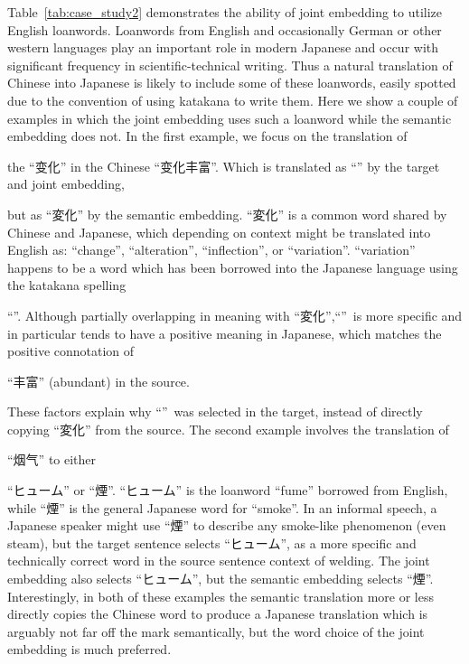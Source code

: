 \begin{CJK}{UTF8}{ipxm}
    Table~\ref{tab:case_study2} demonstrates the ability of joint embedding to utilize English loanwords. Loanwords from English and occasionally German or other western languages play an important role in modern Japanese and occur with significant frequency in scientific-technical writing. Thus a natural translation of Chinese into Japanese is likely to include some of these loanwords, easily spotted due to the convention of using katakana to write them. Here we show a couple of examples in which the joint embedding uses such a loanword while the semantic embedding does not. In the first example, we focus on the translation of \end{CJK}\begin{CJK}{UTF8}{gbsn}the ``变化'' in the Chinese \mbox{``变化丰富''}. Which is translated as ``\variation'' by the target and joint embedding,
    \end{CJK}\begin{CJK}{UTF8}{ipxm} but as ``変化'' by the semantic embedding. ``変化'' is a common word shared by Chinese and Japanese, which depending on context might be translated into English as: ``change'', ``alteration'', ``inflection'', or ``variation''. ``variation'' happens to be a word which has been borrowed into the Japanese language using the katakana spelling \end{CJK}\begin{CJK}{UTF8}{ipxm}``\variation''. Although partially overlapping in meaning with ``変化'',\enspace``\variation''\ is more specific and in particular tends to have a positive meaning in Japanese, which matches the positive connotation of \end{CJK}\begin{CJK}{UTF8}{gbsn}``丰富'' (abundant) in the source. \end{CJK}\begin{CJK}{UTF8}{ipxm}These factors explain why ``\variation''\ was selected in the target, instead of directly copying ``変化'' from the source. The second example involves the translation of
    \end{CJK}\begin{CJK}{UTF8}{gbsn}``烟气'' to either
    \end{CJK}\begin{CJK}{UTF8}{ipxm}``ヒューム'' or ``煙''. ``ヒューム'' is the loanword ``fume'' borrowed from English, while ``煙'' is the general Japanese word for ``smoke''. In an informal speech, a Japanese speaker might use ``煙'' to describe any smoke-like phenomenon (even steam), but the target sentence selects ``ヒューム'', as a more specific and technically correct word in the source sentence context of welding. The joint embedding also selects ``ヒューム'', but the semantic embedding selects ``煙''. Interestingly, in both of these examples the semantic translation more or less directly copies the Chinese word to produce a Japanese translation which is arguably not far off the mark semantically, but the word choice of the joint embedding is much preferred.
\end{CJK}

